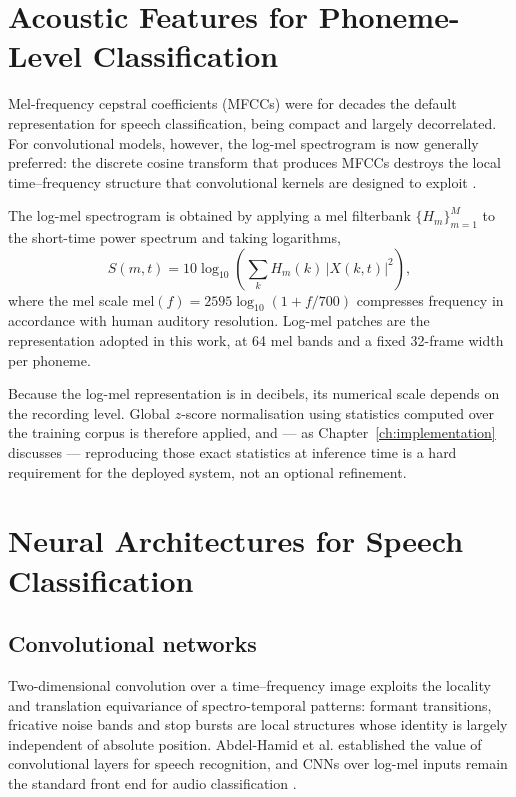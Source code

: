 \section{Acoustic Features for Phoneme-Level Classification}
\label{sec:lit-features}

Mel-frequency cepstral coefficients (MFCCs) were for decades the default
representation for speech classification, being compact and largely
decorrelated. For convolutional models, however, the log-mel spectrogram is now
generally preferred: the discrete cosine transform that produces MFCCs destroys
the local time--frequency structure that convolutional kernels are designed to
exploit \cite{purwins2019deep}.

The log-mel spectrogram is obtained by applying a mel filterbank
$\{H_m\}_{m=1}^{M}$ to the short-time power spectrum and taking logarithms,
\begin{equation}
S(m,t) = 10\log_{10}\!\left(\sum_{k} H_m(k)\,\bigl|X(k,t)\bigr|^{2}\right),
\label{eq:logmel}
\end{equation}
where the mel scale
$\mathrm{mel}(f) = 2595\log_{10}\!\left(1 + f/700\right)$
compresses frequency in accordance with human auditory resolution. Log-mel
patches are the representation adopted in this work, at 64 mel bands and a
fixed 32-frame width per phoneme.

Because the log-mel representation is in decibels, its numerical scale depends
on the recording level. Global $z$-score normalisation using statistics
computed over the training corpus is therefore applied, and --- as
Chapter~\ref{ch:implementation} discusses --- reproducing those exact
statistics at inference time is a hard requirement for the deployed system,
not an optional refinement.

\section{Neural Architectures for Speech Classification}
\label{sec:lit-architectures}

\subsection{Convolutional networks}

Two-dimensional convolution over a time--frequency image exploits the locality
and translation equivariance of spectro-temporal patterns: formant transitions,
fricative noise bands and stop bursts are local structures whose identity is
largely independent of absolute position. Abdel-Hamid et al.
\cite{abdelhamid2014convolutional} established the value of convolutional
layers for speech recognition, and CNNs over log-mel inputs remain the standard
front end for audio classification \cite{hershey2017cnn}.

